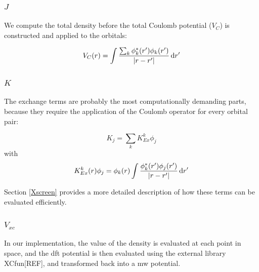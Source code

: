 \documentclass{article}
\begin{document}



\subsubsection{$J$}

We compute the total density before the total Coulomb potential ($V_C$) is constructed and applied to the orbitals:

\begin{equation}
  V_{C}(r) = \int \frac{\sum_k \phi^*_k(r')\phi_k(r')}{|r-r'|} \,\mathrm{d} r'
\end{equation}

\subsubsection{$K$}

The exchange terms are probably the most computationally demanding parts, because they require the application of the Coulomb operator for every orbital pair:

\begin{equation}
  K_{j} = \sum_k  K_{Ex}^k \phi_j 
\end{equation}
with 
\begin{equation}
  K_{Ex}^k(r) \phi_j = \phi_k(r) \int \frac{\phi^*_k(r')\phi_j(r')}{|r-r'|} \,\mathrm{d} r'
\end{equation}

Section \ref{Xscreen} provides a more detailed description of how these terms can be evaluated efficiently. 

\subsubsection{$V_{xc}$}
In our implementation, the value of the density is evaluated at each point in space, and the dft potential is then evaluated using the external library XCfun[REF], and transformed back into a mw potential. 
\end{document}
